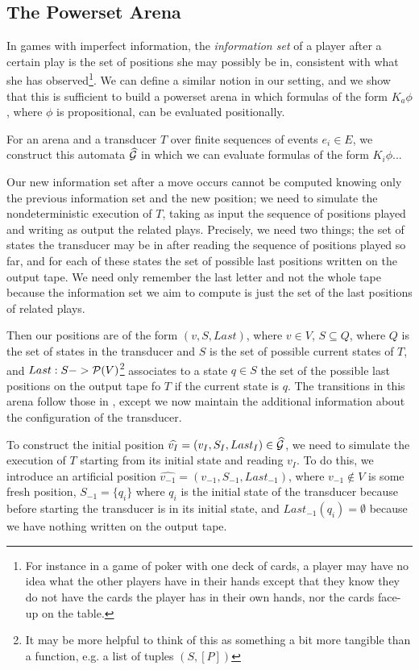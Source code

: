 \documentclass[10pt, a4paper]{report}
\begin{document}
\subsection{The Powerset Arena}
\label{sec:PowersetArena}

In games with imperfect information, the \emph{information set} of a player after a
certain play is the set of positions she may possibly be in, consistent with
what she has observed\footnote{For instance in a game of poker with one deck of cards, a
player may have no idea what the other players have in their hands except that
they know they do not have the cards the player has in their own hands, nor the
cards face-up on the table.}. We can define a similar notion in our setting, and
we show that this is sufficient to build a powerset arena in which formulas of
the form $K_a \phi$, where $\phi$ is propositional, can be evaluated positionally. 

For an arena  and a transducer $T$ over finite sequences of events $e_i \in
E$, we construct this automata $\widehat{\mathcal{G}}$ in which we can evaluate
formulas of the form $K_i \phi$... 

Our new information set after a move occurs cannot be computed knowing only the
previous information set and the new position; we need to simulate the
nondeterministic execution of $T$, taking as input the sequence of positions
played and writing as output the related plays. Precisely, we need two things;
the set of states the transducer may be in after reading the sequence of
positions played so far, and for each of these states the set of possible last
positions written on the output tape. We need only remember the last letter and
not the whole tape because the information set we aim to compute is just the set
of the last positions of related plays.

Then our positions are of the form $(v, S, Last)$, where $v \in V$, $S \subseteq
Q$, where $Q$ is the set of states in the transducer and $S$ is the set of
possible current states of $T$, and $Last : S -> \mathcal{P}(V)$\footnote{It may be
  more helpful to think of this as something a bit more tangible than a
  function, e.g. a list of tuples $(S, [P])$} associates to a state $q \in S$
the set of the possible last positions on the output tape fo $T$ if the current
state is $q$. The transitions in this arena follow those in , except we
now maintain the additional information about the configuration of the
transducer.

To construct the initial position $\widehat{v_I} = (v_I, S_I, Last_I) \in
\widehat{\mathcal{G}}$, we need to simulate the execution of $T$ starting from its
initial state and reading $v_I$. To do this, we introduce an artificial position
$\widehat{v_{-1}} = (v_{-1}, S_{-1}, Last_{-1})$, where $v_{-1} \not \in V$ is
some fresh position, $S_{-1} = \{q_i\}$ where $q_i$ is the initial state of the
transducer because before starting the transducer is in its initial state, and
$Last_{-1} (q_i) = \emptyset$ because we have nothing written on the output
tape.  
\end{document}

